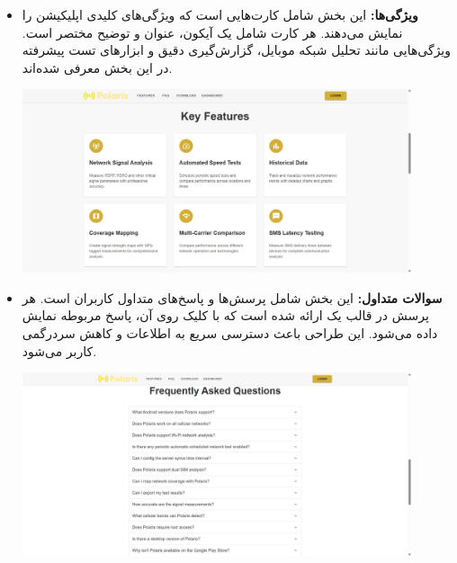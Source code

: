 \begin{itemize}
\begin{itemize}
            \item \textbf{ویژگی‌ها:}  
            این بخش شامل کارت‌هایی است که ویژگی‌های کلیدی اپلیکیشن را نمایش می‌دهند. هر کارت شامل یک آیکون، عنوان و توضیح مختصر است. ویژگی‌هایی مانند تحلیل شبکه موبایل، گزارش‌گیری دقیق و ابزارهای تست پیشرفته در این بخش معرفی شده‌اند.  
            \begin{center}
                \includegraphics[width=0.9\textwidth]{images/fr_features.jpg}
            \end{center}
        
            \item \textbf{سوالات متداول:}  
            این بخش شامل پرسش‌ها و پاسخ‌های متداول کاربران است. هر پرسش در قالب یک  ارائه شده است که با کلیک روی آن، پاسخ مربوطه نمایش داده می‌شود. این طراحی باعث دسترسی سریع به اطلاعات و کاهش سردرگمی کاربر می‌شود.  
            \begin{center}
                \includegraphics[width=0.9\textwidth]{images/fr_faq.jpg}
            \end{center}
        

\end{itemize}
\end{itemize}
